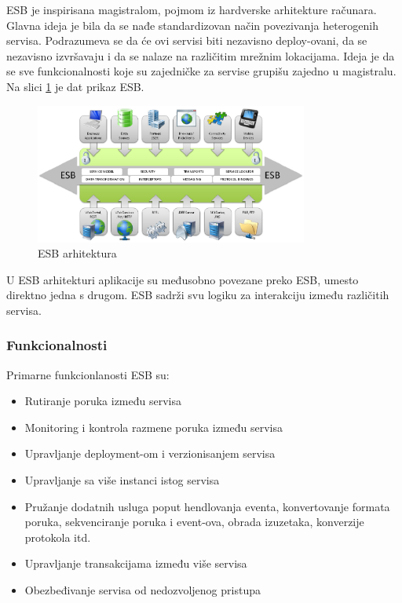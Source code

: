 \documentclass[a4paper,12pt]{report}
\begin{document}
ESB je inspirisana magistralom, pojmom iz hardverske arhitekture računara. Glavna ideja je bila da se nađe standardizovan način povezivanja heterogenih servisa. Podrazumeva se da će ovi servisi biti nezavisno deploy-ovani, da se nezavisno izvršavaju i da se nalaze na različitim mrežnim lokacijama. Ideja je da se sve funkcionalnosti koje su zajedničke za servise grupišu zajedno u magistralu. Na slici \ref{fig:esb-architecture} je dat prikaz ESB. \newline

\begin{figure}[h]
    \centering
    \includegraphics[width=0.8\textwidth]{esb_architecture}
    \caption{ESB arhitektura}
    \label{fig:esb-architecture}
\end{figure}

U ESB arhitekturi aplikacije su međusobno povezane preko ESB, umesto direktno jedna s drugom. ESB sadrži svu logiku za interakciju između različitih servisa. 

\subsubsection{Funkcionalnosti}

Primarne funkcionlanosti ESB su:

\begin{itemize}
	\item Rutiranje poruka između servisa
	\item Monitoring i kontrola razmene poruka između servisa
	\item Upravljanje deployment-om i verzionisanjem servisa
	\item Upravljanje sa više instanci istog servisa
	\item Pružanje dodatnih usluga poput hendlovanja eventa, konvertovanje formata poruka, sekvenciranje poruka i event-ova, obrada izuzetaka, konverzije protokola itd. 
      \item Upravljanje transakcijama između više servisa
	\item Obezbeđivanje servisa od nedozvoljenog pristupa
\end{itemize}
\end{document}
